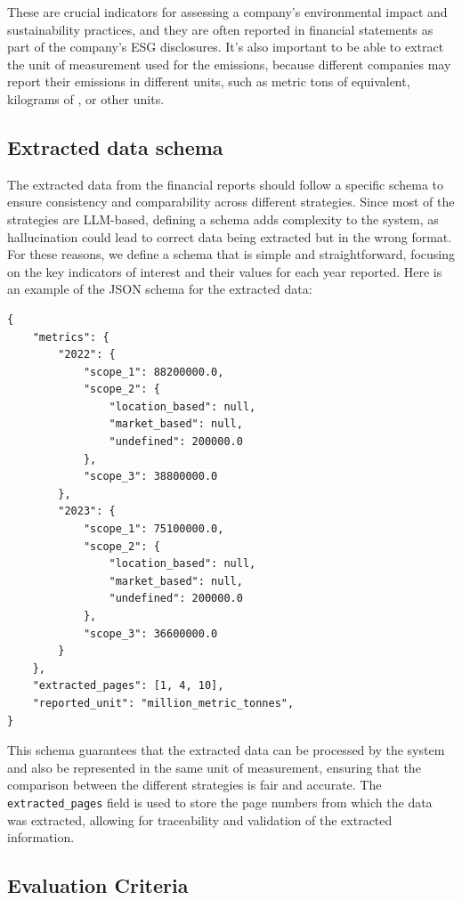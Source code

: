 \documentclass[english, 12pt, a4paper, elec, utf8, a-2b, online]{aaltothesis}
\begin{document}
These are crucial indicators for assessing a company's environmental impact and sustainability practices, and they are often reported in financial statements as part of the company's \ac{ESG} disclosures.
It's also important to be able to extract the unit of measurement used for the emissions, because different companies may report their emissions in different units, such as metric tons of  equivalent, kilograms of , or other units.

\subsection{Extracted data schema}

The extracted data from the financial reports should follow a specific schema to ensure consistency and comparability across different strategies.
Since most of the strategies are \ac{LLM}-based, defining a schema adds complexity to the system, as hallucination could lead to correct data being extracted but in the wrong format.
For these reasons, we define a schema that is simple and straightforward, focusing on the key indicators of interest and their values for each year reported.
Here is an example of the \ac{JSON} schema for the extracted data:

\begin{verbatim}
{
    "metrics": {
        "2022": {
            "scope_1": 88200000.0,
            "scope_2": {
                "location_based": null,
                "market_based": null,
                "undefined": 200000.0
            },
            "scope_3": 38800000.0
        },
        "2023": {
            "scope_1": 75100000.0,
            "scope_2": {
                "location_based": null,
                "market_based": null,
                "undefined": 200000.0
            },
            "scope_3": 36600000.0
        }
    },
    "extracted_pages": [1, 4, 10],
    "reported_unit": "million_metric_tonnes",
}
\end{verbatim}

This schema guarantees that the extracted data can be processed by the system and also be represented in the same unit of measurement, ensuring that the comparison between the different strategies is fair and accurate.
The \texttt{extracted\_pages} field is used to store the page numbers from which the data was extracted, allowing for traceability and validation of the extracted information.

\subsection{Evaluation Criteria}
\end{document}
